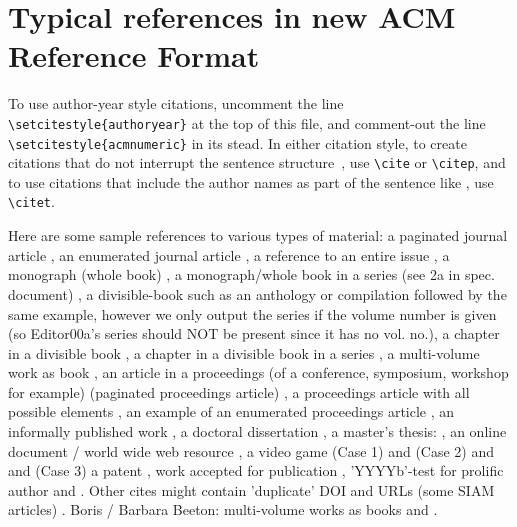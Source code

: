 \documentclass[format=acmsmall, review=false]{acmart}
\begin{document}

\section{Typical references in new ACM Reference Format}

To use author-year style citations, uncomment the line \verb|\setcitestyle{authoryear}| at the top of this file, and comment-out the line \verb|\setcitestyle{acmnumeric}| in its stead.
In either citation style, to create citations that do not interrupt the sentence structure~\cite{Abril07}, use \verb|\cite| or \verb|\citep|, and to use citations that include the author names as part of the sentence like \citet{Abril07}, use \verb|\citet|.

Here are some sample references to various types of material: a paginated journal article \cite{Abril07}, an enumerated
journal article \cite{Cohen07}, a reference to an entire issue \cite{JCohen96},
a monograph (whole book) \cite{Kosiur01}, a monograph/whole book in a series (see 2a in spec. document)
\cite{Harel79}, a divisible-book such as an anthology or compilation \cite{Editor00}
followed by the same example, however we only output the series if the volume number is given
\cite{Editor00a} (so Editor00a's series should NOT be present since it has no vol. no.),
a chapter in a divisible book \cite{Spector90}, a chapter in a divisible book
in a series \cite{Douglass98}, a multi-volume work as book \cite{Knuth97},
an article in a proceedings (of a conference, symposium, workshop for example)
(paginated proceedings article) \cite{Andler79}, a proceedings article
with all possible elements \cite{Smith10}, an example of an enumerated
proceedings article \cite{VanGundy07},
an informally published work \cite{Harel78}, a doctoral dissertation \cite{Clarkson85},
a master's thesis: \cite{anisi03}, an online document / world wide web
resource \cite{Thornburg01, Ablamowicz07, Poker06}, a video game (Case 1) \cite{Obama08} and (Case 2) \cite{Novak03}
and \cite{Lee05} and (Case 3) a patent \cite{JoeScientist001},
work accepted for publication \cite{rous08}, 'YYYYb'-test for prolific author
\cite{SaeediMEJ10} and \cite{SaeediJETC10}. Other cites might contain
'duplicate' DOI and URLs (some SIAM articles) \cite{Kirschmer:2010:AEI:1958016.1958018}.
Boris / Barbara Beeton: multi-volume works as books
\cite{MR781536} and \cite{MR781537}.

%
%
%
%
%
\end{document}

